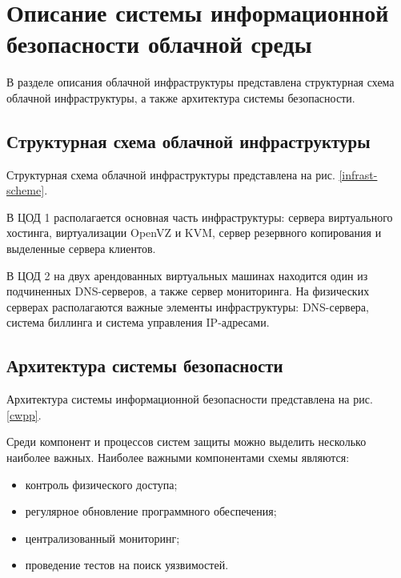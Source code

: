 \section{Описание системы информационной безопасности облачной среды}

В разделе описания облачной инфраструктуры представлена структурная схема облачной инфраструктуры, а также архитектура системы безопасности.

\subsection{Структурная схема облачной инфраструктуры}

Структурная схема облачной инфраструктуры представлена на рис. \ref{infrast-scheme}.


В ЦОД 1 располагается основная часть инфраструктуры: сервера виртуального хостинга, виртуализации OpenVZ и KVM, сервер резервного копирования и выделенные сервера клиентов.

В ЦОД 2 на двух арендованных виртуальных машинах находится один из подчиненных DNS-серверов, а также сервер мониторинга.
На физических серверах располагаются важные элементы инфраструктуры: DNS-сервера, система биллинга и система управления IP-адресами.

\subsection{Архитектура системы безопасности}

Архитектура системы информационной безопасности представлена на рис. \ref{cwpp}.


Среди компонент и процессов систем защиты можно выделить несколько наиболее важных.
Наиболее важными компонентами схемы являются:
\begin{itemize}
  \item контроль физического доступа;
  \item регулярное обновление программного обеспечения;
  \item централизованный мониторинг;
  \item проведение тестов на поиск уязвимостей.
\end{itemize}

\clearpage